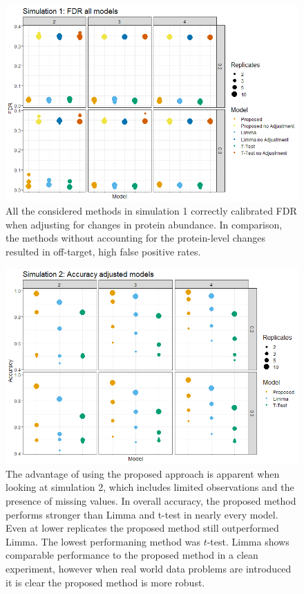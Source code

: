 \documentclass[mcp]{article}
\numberwithin{figure}{section} %
\numberwithin{table}{section}
\begin{document}
\begin{figure}[ht]
\centering
\includegraphics[width=1\textwidth]{images/sim1_FDR_all_models.png}
\caption{All the considered methods in simulation 1 correctly calibrated FDR when adjusting for changes in protein abundance. In comparison, the methods without accounting for the protein-level changes resulted in off-target, high false positive rates.
}\label{fig:fdr_all_models}
\end{figure}

\begin{figure}[ht]
\centering
\includegraphics[width=1\textwidth]{images/sim3_Accuracy.png}
\caption{The advantage of using the proposed approach is apparent when looking at simulation 2, which includes limited observations and the presence of missing values. In overall accuracy, the proposed method performs stronger than Limma and t-test in nearly every model. Even at lower replicates the proposed method still outperformed Limma. The lowest performaning method was $t$-test. Limma shows comparable performance to the proposed method in a clean experiment, however when real world data problems are introduced it is clear the proposed method is more robust.}
\label{fig:sim_accuracy}
\end{figure}
\end{document}
